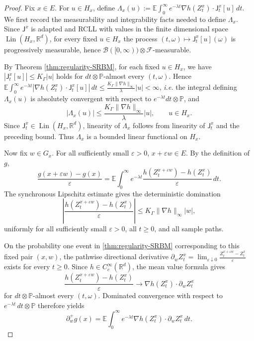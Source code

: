 \documentclass[aihp]{imsart}
\numberwithin{equation}{section}
\theoremstyle{plain}
\theoremstyle{definition}
\newcommand{\1}{\mathbf 1}
\begin{document}
\begin{proof}
Fix \(x\in E\). For \(u\in H_x\), define $\Lambda_x(u)
:=
\mathbb E\int_0^\infty e^{-\lambda t}
\nabla h(Z_t^x)\cdot \mathsf J_t^x[u]\,dt .$ We first record the measurability and integrability facts needed to define
\(\Lambda_x\). Since \(\mathsf J^x\) is adapted and RCLL with values in the finite dimensional space
\(\operatorname{Lin}(H_x,\mathbb R^d)\), for every fixed \(u\in H_x\) the process $(t,\omega)\mapsto \mathsf J_t^x[u](\omega)$ is progressively measurable, hence \(\mathcal B([0,\infty))\otimes\mathcal F\)-measurable.


By Theorem \ref{thm:regularity-SRBM}, for each fixed \(u\in H_x\), we have 
\(
|\mathsf J_t^x[u]|\le K_\Gamma |u|\) holds for \(dt\otimes \mathbb P\)-almost every \((t,\omega)\). Hence  $\mathbb E\int_0^\infty e^{-\lambda t}
\left|\nabla h(Z_t^x)\cdot \mathsf J_t^x[u]\right|\,dt
\le
\frac{K_\Gamma\|\nabla h\|_\infty}{\lambda}|u|<\infty $, \emph{i.e.} the integral
defining \(\Lambda_x(u)\) is absolutely convergent with
respect to \(e^{-\lambda t}dt\otimes\mathbb P\), and
\[
|\Lambda_x(u)|
\le
\frac{K_\Gamma\|\nabla h\|_\infty}{\lambda}|u|,
\qquad u\in H_x .
\]
Since \(\mathsf J_t^x\in \operatorname{Lin}(H_x,\mathbb R^d)\), linearity of
\(\Lambda_x\) follows from linearity of \(\mathsf J_t^x\) and the preceding bound.
Thus \(\Lambda_x\) is a bounded linear functional on \(H_x\).

Now fix \(w\in G_x\). For all sufficiently small \(\varepsilon>0\),
\(x+\varepsilon w\in E\). By the definition of \(g\),
\begin{equation}
\frac{g(x+\varepsilon w)-g(x)}{\varepsilon}
=
\mathbb E\int_0^\infty e^{-\lambda t}
\frac{h(Z_t^{x+\varepsilon w})-h(Z_t^x)}{\varepsilon}\,dt .
\end{equation}
The synchronous Lipschitz estimate gives the deterministic domination
\begin{equation}
\left|
\frac{h(Z_t^{x+\varepsilon w})-h(Z_t^x)}{\varepsilon}
\right|
\le
K_\Gamma \|\nabla h\|_\infty |w| ,
\end{equation}
uniformly for all sufficiently small \(\varepsilon>0\), all \(t\ge0\), and all
sample paths.

On the probability one event in \cref{thm:regularity-SRBM} corresponding to this fixed pair
\((x,w)\), the pathwise directional derivative
\(
\partial_w Z_t^x
=
\lim_{\varepsilon\downarrow0}
\frac{Z_t^{x+\varepsilon w}-Z_t^x}{\varepsilon}\) exists for every \(t\ge0\). Since \(h\in C_c^\infty(\mathbb R^d)\), the
mean value formula gives
\[
\frac{h(Z_t^{x+\varepsilon w})-h(Z_t^x)}{\varepsilon}
\longrightarrow
\nabla h(Z_t^x)\cdot \partial_w Z_t^x
\]
for \(dt\otimes\mathbb P\)-almost every \((t,\omega)\). Dominated convergence
with respect to \(e^{-\lambda t}\,dt\otimes\mathbb P\) therefore yields
\begin{equation}\label{eq:resolvent-derivative-process}
\partial_w^+ g(x)
=
\mathbb E\int_0^\infty e^{-\lambda t}
\nabla h(Z_t^x)\cdot \partial_w Z_t^x\,dt .
\end{equation}


\end{proof}
\end{document}
